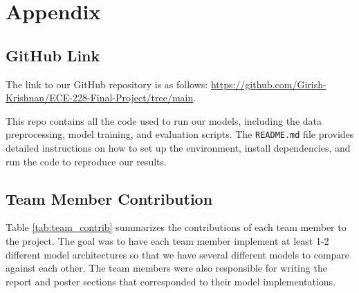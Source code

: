 \documentclass{article}
\newcommand{\instructions}[1]{{\color{blue} #1}}
\begin{document}
\newpage
\section*{Appendix}
\subsection*{GitHub Link}

The link to our GitHub repository is as follows: \url{https://github.com/Girish-Krishnan/ECE-228-Final-Project/tree/main}. 

This repo contains all the code used to run our models, including the data preprocessing, model training, and evaluation scripts. The \texttt{README.md} file provides detailed instructions on how to set up the environment, install dependencies, and run the code to reproduce our results.


\subsection*{Team Member Contribution}
Table \ref{tab:team_contrib} summarizes the contributions of each team member to the project. The goal was to have each team member implement at least 1-2 different model architectures so that we have several different models to compare against each other. The team members were also responsible for writing the report and poster sections that corresponded to their model implementations.
\end{document}
